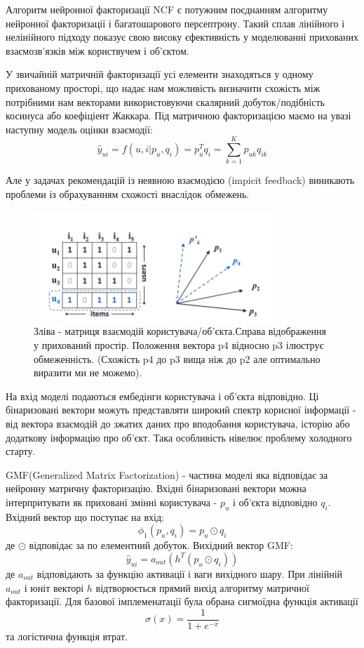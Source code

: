 Алгоритм нейронної факторизації NCF є потужним поєднанням алгоритму нейронної факторизації і багатошарового персептрону. Такий сплав лінійного і нелінійного підходу показує свою високу єфективність у моделюванні прихованих  взаємозв’язків між користвучем і об’єктом.

У звичайній матричній факторизації усі елементи знаходяться у одному прихованому просторі, що надає нам можливість визначити схожість між потрібними нам векторами використовуючи скалярний добуток/подібність косинуса або коефіціент Жаккара. Під матричною факторизацією маємо на увазі наступну модель оцінки взаємодії:
\[\hat{y}_{ui} = f(u,i|p_{u},q_{i}) = p^{T}_{u}q_{i} = \sum_{k = 1}^{K}p_{uk}q_{ik}\]

Але у задачах рекомендацій із неявною взаємодією (impicit feedback)
виникають проблеми із обрахуванням схожості внаслідок обмежень.

\begin{figure}
    \centering
    \includegraphics[width=0.8\textwidth]{images/MF_limitation.png}
    \caption{Зліва - матриця взаємодій користувача/об’єкта.Справа відображення у прихований простір. Положення вектора p4 відносно p3 ілюструє обмеженність. (Схожість p4 до p3 вища ніж до p2 але оптимально виразити ми не можемо).  }
\end{figure}

На вхід моделі подаються ембедінги користувача і об’єкта відповідно. Ці бінаризовані вектори можуть представляти широкий спектр корисної інформації - від вектора взаємодій до зжатих даних про вподобання користувача, історію або додаткову інформацію про об’єкт. Така особливість нівелює проблему холодного старту.

GMF(Generalized Matrix Factorization) - частина моделі яка відповідає за нейронну матричну факторизацію. Вхідні бінаризовані вектори можна інтерпритувати як приховані змінні користувача - $p_{u}$ і об’єкта відповідно $q_i$. Вхідний вектор що поступає на вхід:
\[\phi_{1}(p_{u}, q_{i}) = p_{u} \odot q_{i}\]
де $\odot$  відповідає за по елементний добуток. Вихідний вектор GMF:
\[\hat{y}_{ui} = a_{out}(h^{T}(p_{u} \odot q_{i}))\]
де $a_{out}$ відповідають за функцію активації і ваги вихідного шару.
При лінійній $a_{out}$ і юніт векторі $h$ відтворюється прямий вихід алгоритму матричної факторизації. Для базової імплеменатації була обрана сигмоїдна функція активації
\[ \sigma(x) = \frac{1}{1 + e^{-x}}\]
та логістична функція втрат.

